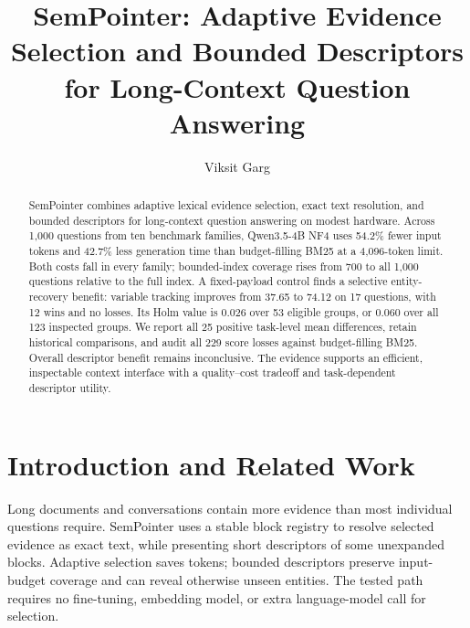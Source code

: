\documentclass[runningheads]{llncs}
\begin{document}
\raggedbottom
\title{SemPointer: Adaptive Evidence Selection and Bounded Descriptors for Long-Context Question Answering}
\author{Viksit Garg}
\maketitle

\begin{abstract}
SemPointer combines adaptive lexical evidence selection, exact text resolution, and bounded descriptors for long-context question answering on modest hardware. Across 1,000 questions from ten benchmark families, Qwen3.5-4B NF4 uses 54.2\% fewer input tokens and 42.7\% less generation time than budget-filling BM25 at a 4,096-token limit. Both costs fall in every family; bounded-index coverage rises from 700 to all 1,000 questions relative to the full index. A fixed-payload control finds a selective entity-recovery benefit: variable tracking improves from 37.65 to 74.12 on 17 questions, with 12 wins and no losses. Its Holm value is 0.026 over 53 eligible groups, or 0.060 over all 123 inspected groups. We report all 25 positive task-level mean differences, retain historical comparisons, and audit all 229 score losses against budget-filling BM25. Overall descriptor benefit remains inconclusive. The evidence supports an efficient, inspectable context interface with a quality--cost tradeoff and task-dependent descriptor utility.
\end{abstract}

\section{Introduction and Related Work}
Long documents and conversations contain more evidence than most individual questions require. SemPointer uses a stable block registry to resolve selected evidence as exact text, while presenting short descriptors of some unexpanded blocks. Adaptive selection saves tokens; bounded descriptors preserve input-budget coverage and can reveal otherwise unseen entities. The tested path requires no fine-tuning, embedding model, or extra language-model call for selection.
\end{document}
